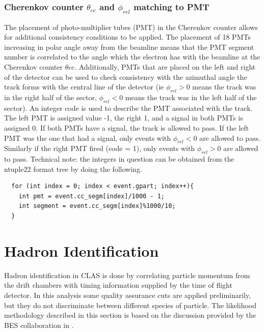 \subsubsection*{Cherenkov counter $\theta_{cc}$ and $\phi_{rel}$ matching to PMT}
The placement of photo-multiplier tubes (PMT) in the Cherenkov counter allows for additional consistency conditions to be applied.  The placement of 18 PMTs increasing in polar angle away from the beamline means that the PMT segment number is correlated to the angle which the electron has with the beamline at the Cherenkov counter $\theta{cc}$.  Additionally, PMTs that are placed on the left and right of the detector can be used to check consistency with the azimuthal angle the track forms with the central line of the detector (ie $\phi_{rel} > 0$ means the track was in the right half of the sector, $\phi_{rel} < 0$ means the track was in the left half of the sector).  An integer code is used to describe the PMT associated with the track.  The left PMT is assigned value -1, the right 1, and a signal in both PMTs is assigned 0.  If both PMTs have a signal, the track is allowed to pass.  If the left PMT was the one that had a signal, only events with $\phi_{rel} < 0$ are allowed to pass.  Similarly if the right PMT fired (code = 1), only events with $\phi_{rel} > 0$ are allowed to pass.  Technical note: the integers in question can be obtained from the ntuple22 format tree by doing the following.

\begin{lstlisting}
  for (int index = 0; index < event.gpart; index++){
    int pmt = event.cc_segm[index]/1000 - 1;
    int segment = event.cc_segm[index]%1000/10; 
  }
\end{lstlisting}


\section{Hadron Identification}
Hadron identification in CLAS is done by correlating particle momentum from the drift chambers with timing information supplied by the time of flight detector.  In this analysis some quality assurance cuts are applied preliminarily, but they do not discriminate between different species of particle.  The likelihood methodology described in this section is based on the discussion provided by the BES collaboration in \cite{bes-physics}.  

